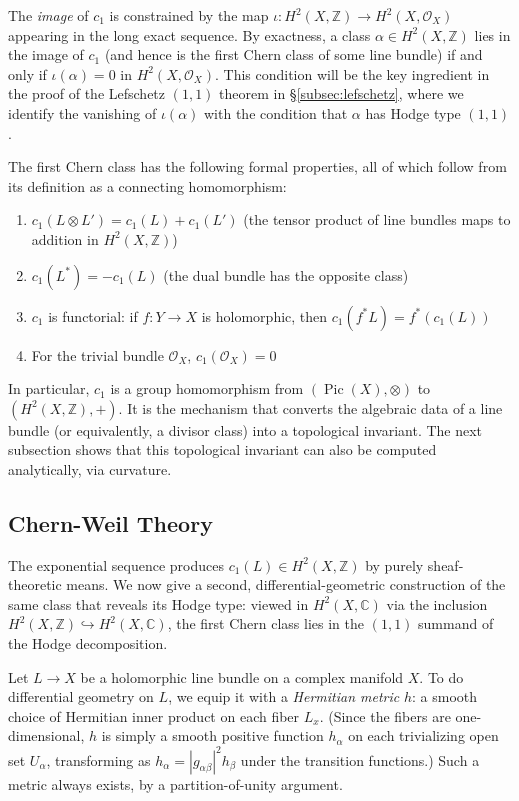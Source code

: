 \documentclass{article}
\newcommand{\C}{\mathbb{C}}
\newcommand{\Z}{{\mathbb{Z}}}
\newcommand{\CO}{\mathcal{O}}
\newcommand{\Pic}{\operatorname{Pic}}
\begin{document}
The \emph{image} of $c_1$ is constrained by the map
$\iota: H^2(X, \Z) \to H^2(X, \CO_X)$ appearing in the long exact sequence.
By exactness, a class $\alpha \in H^2(X, \Z)$ lies in the image of $c_1$ (and
hence is the first Chern class of some line bundle) if and only if
$\iota(\alpha) = 0$ in $H^2(X, \CO_X)$. This condition will be the key
ingredient in the proof of the Lefschetz $(1,1)$ theorem in
\S\ref{subsec:lefschetz}, where we identify the vanishing of $\iota(\alpha)$
with the condition that $\alpha$ has Hodge type $(1,1)$.

The first Chern class has the following formal properties, all of which follow
from its definition as a connecting homomorphism:
\begin{enumerate}
  \item $c_1(L \otimes L') = c_1(L) + c_1(L')$ (the tensor product of line
    bundles maps to addition in $H^2(X, \Z)$)
  \item $c_1(L^*) = -c_1(L)$ (the dual bundle has the opposite class)
  \item $c_1$ is functorial: if $f: Y \to X$ is holomorphic, then
    $c_1(f^*L) = f^*(c_1(L))$
  \item For the trivial bundle $\CO_X$, $c_1(\CO_X) = 0$
\end{enumerate}
In particular, $c_1$ is a group homomorphism from $(\Pic(X), \otimes)$ to
$(H^2(X, \Z), +)$. It is the mechanism that converts the algebraic data of a
line bundle (or equivalently, a divisor class) into a topological invariant.
The next subsection shows that this topological invariant can also be computed
analytically, via curvature.

\subsection{Chern-Weil Theory}\label{subsec:chernweil}

The exponential sequence produces $c_1(L) \in H^2(X, \Z)$ by purely
sheaf-theoretic means. We now give a second, differential-geometric
construction of the same class that reveals its Hodge type: viewed in
$H^2(X, \C)$ via the inclusion $H^2(X, \Z) \hookrightarrow H^2(X, \C)$, the
first Chern class lies in the $(1,1)$ summand of the Hodge decomposition.

Let $L \to X$ be a holomorphic line bundle on a complex manifold $X$. To do
differential geometry on $L$, we equip it with a \emph{Hermitian metric} $h$: a
smooth choice of Hermitian inner product on each fiber $L_x$. (Since the fibers
are one-dimensional, $h$ is simply a smooth positive function $h_\alpha$ on
each trivializing open set $U_\alpha$, transforming as
$h_\alpha = |g_{\alpha\beta}|^2 h_\beta$ under the transition functions.) Such
a metric always exists, by a partition-of-unity argument.
\end{document}
